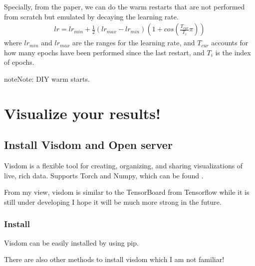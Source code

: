 \documentclass[letterpaper,10pt,english]{sphinxmanual}
\begin{document}
Specially, from the paper, we can do the warm restarts that are not performed from scratch but emulated by decaying the learning rate.
\begin{equation*}
\begin{split}lr = lr_{min} + \frac{1}{2} (lr_{max} - lr_{min}) (1 + cos(\frac{T_{cur}}{T_i}\pi))\end{split}
\end{equation*}
where \(lr_{min}\) and \(lr_{max}\) are the ranges for the learning rate, and \(T_{cur}\) accounts for how many epochs have been performed since the last restart, and \(T_{i}\) is the index of epochs.

\begin{sphinxadmonition}{note}{Note:}
DIY warm starts.
\end{sphinxadmonition}


\section{Visualize your results!}
\label{\detokenize{usage/view:visualize-your-results}}\label{\detokenize{usage/view::doc}}

\subsection{Install Visdom and Open server}
\label{\detokenize{usage/view:install-visdom-and-open-server}}
Visdom is a flexible tool for creating, organizing, and sharing visualizations of live, rich data. Supports Torch and Numpy, which can be found .

From my view, visdom is similar to the TensorBoard from Tensorflow while it is still under developing I hope it will be much more strong in the future.


\subsubsection{Install}
\label{\detokenize{usage/view:install}}
Visdom can be easily installed by using pip.

%
\begin{sphinxVerbatim}[commandchars=\\\{\}]
  
\end{sphinxVerbatim}

There are also other methods to install visdom which I am not familiar!
\end{document}
